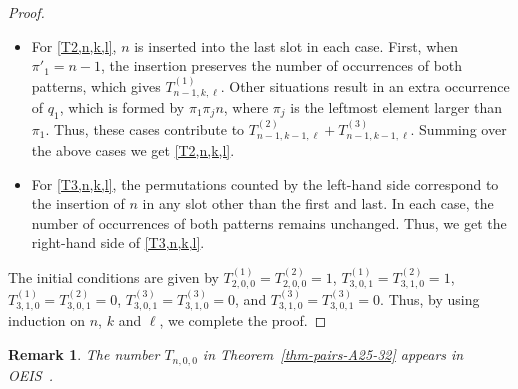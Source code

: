 \documentclass[12pt]{article}
\newtheorem*{remark}{Remark}
\begin{document}
\begin{proof}
\begin{itemize}
\item For \eqref{T2,n,k,l}, $n$ is inserted into the last slot in each case. First, when $\pi'_1=n-1$, the insertion preserves the number of occurrences of both patterns, which gives $T^{(1)}_{n-1,k,\ell}$. Other situations  result in  an extra occurrence of $q_1$, which is formed by $\pi_1\pi_jn$, where $\pi_j$ is the leftmost element larger than $\pi_1$. Thus, these cases contribute to $T^{(2)}_{n-1,k-1,\ell}+T^{(3)}_{n-1,k-1,\ell}$. Summing over the above cases we get \eqref{T2,n,k,l}.
\item For \eqref{T3,n,k,l}, the permutations counted by the left-hand side correspond to the insertion of $n$ in any slot other than the first and last. In each case, the number of occurrences of both patterns remains unchanged. Thus, we get the right-hand side of \eqref{T3,n,k,l}.
\end{itemize} 

The initial conditions are given by $T^{(1)}_{2,0,0}=T^{(2)}_{2,0,0}=1$, $T^{(1)}_{3,0,1}=T^{(2)}_{3,1,0}=1$, $T^{(1)}_{3,1,0}=T^{(2)}_{3,0,1}=0$, $T^{(3)}_{3,0,1}=T^{(3)}_{3,1,0}=0$, and $T^{(3)}_{3,1,0}=T^{(3)}_{3,0,1}=0$.  
Thus, by using induction on $n$, $k$ and $\ell$, we complete the proof.
\end{proof}


\begin{remark} 
The number $T_{n,0,0}$ in Theorem~\ref{thm-pairs-A25-32} appears in OEIS~\cite[A054091]{OEIS}. 
\end{remark}
\end{document}
